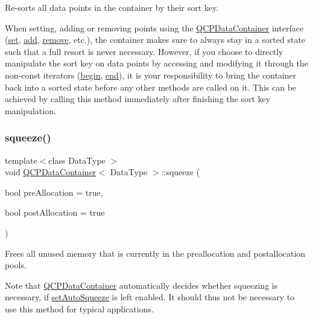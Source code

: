 Re-\/sorts all data points in the container by their sort key.

When setting, adding or removing points using the \hyperlink{classQCPDataContainer}{Q\+C\+P\+Data\+Container} interface (\hyperlink{classQCPDataContainer_ae7042bd534fc3ce7befa2ce3f790b5bf}{set}, \hyperlink{classQCPDataContainer_a42b98bd994307ccd163a43d576f91ad9}{add}, \hyperlink{classQCPDataContainer_ae5f569a120648b167efa78835f12fd38}{remove}, etc.), the container makes sure to always stay in a sorted state such that a full resort is never necessary. However, if you choose to directly manipulate the sort key on data points by accessing and modifying it through the non-\/const iterators (\hyperlink{classQCPDataContainer_a80032518413ab8f418f7c81182fd06cb}{begin}, \hyperlink{classQCPDataContainer_acf66dfad83fe041380f5e0491e7676f2}{end}), it is your responsibility to bring the container back into a sorted state before any other methods are called on it. This can be achieved by calling this method immediately after finishing the sort key manipulation. \mbox{\label{classQCPDataContainer_a82fcc511def22287fc62579d0706387c}} 
\subsubsection{\texorpdfstring{squeeze()}{squeeze()}}
{\footnotesize\ttfamily template$<$class Data\+Type $>$ \\
void \hyperlink{classQCPDataContainer}{Q\+C\+P\+Data\+Container}$<$ Data\+Type $>$\+::squeeze (\begin{DoxyParamCaption}\item[{bool}]{pre\+Allocation = {\ttfamily true},  }\item[{bool}]{post\+Allocation = {\ttfamily true} }\end{DoxyParamCaption})}

Frees all unused memory that is currently in the preallocation and postallocation pools.

Note that \hyperlink{classQCPDataContainer}{Q\+C\+P\+Data\+Container} automatically decides whether squeezing is necessary, if \hyperlink{classQCPDataContainer_a233f866760a78950d2a393c1a4bc54b5}{set\+Auto\+Squeeze} is left enabled. It should thus not be necessary to use this method for typical applications.

